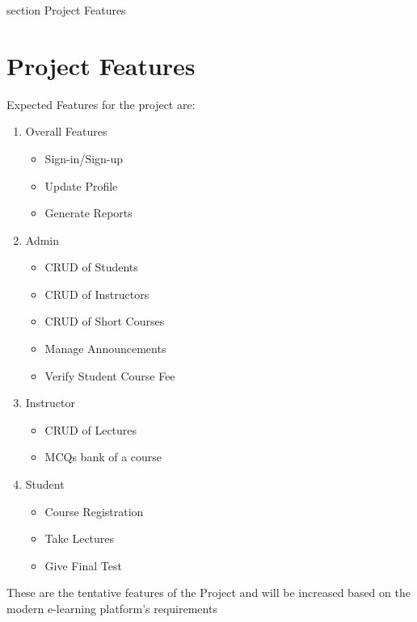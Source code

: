 

 {section} {Project Features}
\section*{Project Features}
\label{Project Features}

Expected Features for the project are:

\begin{enumerate}
    \item Overall Features
       \begin{itemize}
         \item Sign-in/Sign-up
         \item Update Profile
         \item Generate Reports
       \end{itemize}
   \item Admin
   \begin{itemize}
     \item CRUD of Students
     \item CRUD of Instructors
     \item CRUD of Short Courses
     \item Manage Announcements
     \item Verify Student Course Fee
   \end{itemize}
   \item Instructor
   \begin{itemize}
     \item CRUD of Lectures
     \item MCQs bank of a course
   \end{itemize}
   \item Student
   \begin{itemize}
     \item Course Registration
     \item Take Lectures
     \item Give Final Test
   \end{itemize}
\end{enumerate}

These are the tentative features of the Project and will be increased based on the modern e-learning platform's requirements
\clearpage